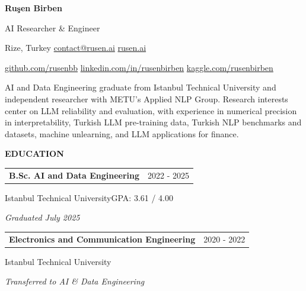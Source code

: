 \documentclass[11pt,a4paper]{article}
\makeatletter
\newcommand{\cvlink}[2]{\href{#1}{\textcolor{linkblue}{#2}}}
\newcommand{\cvsep}{\enspace\textperiodcentered\enspace{}}
\newcommand{\cvsection}[3][5]{%
  \par\Needspace*{#1\baselineskip}\vspace{6pt}%
  {\bfseries\fontsize{11}{13}\selectfont #3}\par\nobreak
  \vspace{3pt}{\color{muted}\hrule height 0.4pt}\nobreak\vspace{6pt}%
}
\newcommand{\cvheading}[2]{%
  \begin{tabularx}{\linewidth}{@{}>{\raggedright\arraybackslash}X@{\hspace{10pt}}r@{}}%
  \textbf{#1} & {\small\color{muted}#2}\\
  \end{tabularx}\par\nobreak
}
\newcommand{\dates}[1]{\hfill{\small\color{muted}#1}}
\newcommand{\cvbody}[1]{{\small\raggedright #1\par}}
\makeatother
\begin{document}
\thispagestyle{firstpage}

{\fontsize{24}{28}\selectfont{}\bfseries{} Ruşen Birben}\par\vspace{3pt}
{\fontsize{11}{13}\selectfont{}AI Researcher \& Engineer}\par\vspace{6pt}
{\small{}
Rize, Turkey\cvsep
\cvlink{mailto:contact@rusen.ai}{contact@rusen.ai}\cvsep
\cvlink{https://rusen.ai}{rusen.ai}\par\vspace{4pt}
\cvlink{https://github.com/rusenbb}{github.com/rusenbb}\cvsep
\cvlink{https://linkedin.com/in/rusenbirben}{linkedin.com/in/rusenbirben}\cvsep
\cvlink{https://www.kaggle.com/rusenbirben}{kaggle.com/rusenbirben}
}\par\vspace{6pt}
\cvbody{AI and Data Engineering graduate from Istanbul Technical University and independent researcher with METU’s Applied NLP Group. Research interests center on LLM reliability and evaluation, with experience in numerical precision in interpretability, Turkish LLM pre-training data, Turkish NLP benchmarks and datasets, machine unlearning, and LLM applications for finance.}

\cvsection{}{EDUCATION}
\begin{minipage}{\linewidth}\raggedright
\cvheading{B.Sc. AI and Data Engineering}{2022 - 2025}
{\small{}Istanbul Technical University}\dates{GPA: 3.61 / 4.00}\par
{\small{}\itshape{}\color{muted}Graduated July 2025}\par\end{minipage}\par\vspace{5pt}
\begin{minipage}{\linewidth}\raggedright
\cvheading{Electronics and Communication Engineering}{2020 - 2022}
{\small{}Istanbul Technical University}\par
{\small{}\itshape{}\color{muted}Transferred to AI \& Data Engineering}\par\end{minipage}\par\vspace{5pt}
\end{document}
